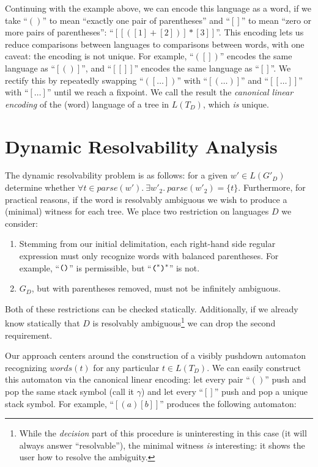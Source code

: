 \documentclass[runningheads]{llncs}
\newcommand{\parse}{\mathit{parse}} %
\newcommand{\words}{\mathit{words}} %
\newcommand{\reqpl}{(}
\newcommand{\reqpr}{)}
\newcommand{\reqp}[1]{\reqpl#1\reqpr}
\newcommand{\pospl}{[}
\newcommand{\pospr}{]}
\newcommand{\posp}[1]{\pospl#1\pospr}
\begin{document}
Continuing with the example above, we can encode this language as a word, if we take ``$\reqp{}$'' to mean ``exactly one pair of parentheses'' and ``$\posp{}$'' to mean ``zero or more pairs of parentheses'': ``$\posp{\posp{\reqp{\posp{1} + \posp{2}}} * \posp{3}}$''. This encoding lets us reduce comparisons between languages to comparisons between words, with one caveat: the encoding is not unique. For example, ``$\reqp{\posp{}}$'' encodes the same language as ``$\posp{\reqp{}}$'', and ``$\posp{\posp{}}$'' encodes the same language as ``$\posp{}$''. We rectify this by repeatedly swapping ``$\reqp{\posp{\ldots}}$'' with ``$\posp{\reqp{\ldots}}$'' and ``$\posp{\posp{\ldots}}$'' with ``$\posp{\ldots}$'' until we reach a fixpoint. We call the result the \emph{canonical linear encoding} of the (word) language of a tree in $L(T_D)$, which \emph{is} unique.

\section{Dynamic Resolvability Analysis} \label{sec:dynamic}

The dynamic resolvability problem is as follows: for a given $w' \in L(G'_D)$ determine whether $\forall t \in \parse(w').\ \exists w'_2.\ \parse(w'_2) = \{t\}$. Furthermore, for practical reasons, if the word is resolvably ambiguous we wish to produce a (minimal) witness for each tree. We place two restriction on languages $D$ we consider:

\begin{enumerate}
\item Stemming from our initial delimitation, each right-hand side regular expression must only recognize words with balanced parentheses. For example, ``$\verb|(| \verb|)|$'' is permissible, but ``$\verb|(|^{*} \verb|)|^{*}$'' is not.
\item $G_D$, but with parentheses removed, must not be infinitely ambiguous.
\end{enumerate}

\noindent Both of these restrictions can be checked statically. Additionally, if we already know statically that $D$ is resolvably ambiguous\footnote{While the \emph{decision} part of this procedure is uninteresting in this case (it will always answer ``resolvable''), the minimal witness \emph{is} interesting: it shows the user how to resolve the ambiguity.} we can drop the second requirement.

Our approach centers around the construction of a visibly pushdown automaton recognizing $\words(t)$ for any particular $t \in L(T_D)$. We can easily construct this automaton via the canonical linear encoding: let every pair ``$\reqp{}$'' push and pop the same stack symbol (call it $\gamma$) and let every ``$\posp{}$'' push and pop a unique stack symbol. For example, ``$\posp{\reqp{a}\posp{b}}$'' produces the following automaton:
\end{document}
